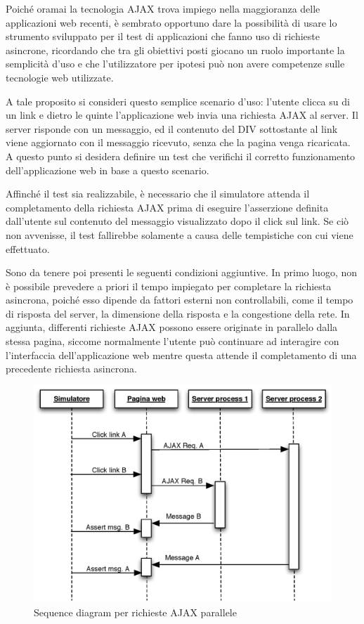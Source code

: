 Poiché oramai la tecnologia AJAX trova impiego nella maggioranza delle applicazioni web recenti, è sembrato opportuno dare la possibilità di usare lo strumento sviluppato per il test di applicazioni che fanno uso di richieste asincrone, ricordando che tra gli obiettivi posti giocano un ruolo importante la semplicità d'uso e che l'utilizzatore per ipotesi può non avere competenze sulle tecnologie web utilizzate. 

A tale proposito si consideri questo semplice scenario d'uso: l'utente clicca su di un link e dietro le quinte l'applicazione web invia una richiesta AJAX al server. Il server risponde con un messaggio, ed il contenuto del DIV sottostante al link viene aggiornato con il messaggio ricevuto, senza che la pagina venga ricaricata. A questo punto si desidera definire un test che verifichi il corretto funzionamento dell'applicazione web in base a questo scenario. 

Affinché il test sia realizzabile, è necessario che il simulatore attenda il completamento della richiesta AJAX prima di eseguire l'asserzione definita dall'utente sul contenuto del messaggio visualizzato dopo il click sul link. Se ciò non avvenisse, il test fallirebbe solamente a causa delle tempistiche con cui viene effettuato.

Sono da tenere poi presenti le seguenti condizioni aggiuntive. In primo luogo, non è possibile prevedere a priori il tempo impiegato per completare la richiesta asincrona, poiché esso dipende da fattori esterni non controllabili, come il tempo di risposta del server, la dimensione della risposta e la congestione della rete. In aggiunta, differenti richieste AJAX possono essere originate in parallelo dalla stessa pagina, siccome normalmente l'utente può continuare ad interagire con l'interfaccia dell'applicazione web mentre questa attende il completamento di una precedente richiesta asincrona.

\begin{figure}[htbp]
\begin{center}
\includegraphics[width=\textwidth]{images/ajax_sync.eps}
\caption{Sequence diagram per richieste AJAX parallele}
\label{fig:ajaxSequence}
\end{center}
\end{figure}


